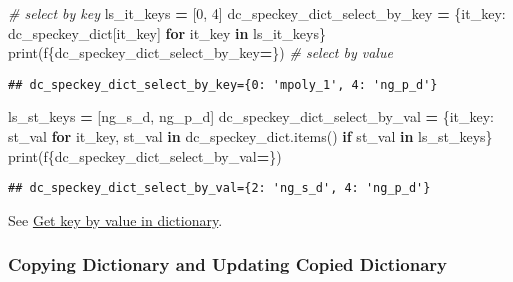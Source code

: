 \documentclass[
]{book}
\newenvironment{Shaded}{\begin{snugshade}}{\end{snugshade}}
\newcommand{\BuiltInTok}[1]{#1}
\newcommand{\CommentTok}[1]{\textcolor[rgb]{0.56,0.35,0.01}{\textit{#1}}}
\newcommand{\ControlFlowTok}[1]{\textcolor[rgb]{0.13,0.29,0.53}{\textbf{#1}}}
\newcommand{\DecValTok}[1]{\textcolor[rgb]{0.00,0.00,0.81}{#1}}
\newcommand{\KeywordTok}[1]{\textcolor[rgb]{0.13,0.29,0.53}{\textbf{#1}}}
\newcommand{\NormalTok}[1]{#1}
\newcommand{\OperatorTok}[1]{\textcolor[rgb]{0.81,0.36,0.00}{\textbf{#1}}}
\newcommand{\SpecialCharTok}[1]{\textcolor[rgb]{0.00,0.00,0.00}{#1}}
\newcommand{\SpecialStringTok}[1]{\textcolor[rgb]{0.31,0.60,0.02}{#1}}
\newcommand{\StringTok}[1]{\textcolor[rgb]{0.31,0.60,0.02}{#1}}
\begin{document}
\begin{Shaded}
\begin{Highlighting}[]
\CommentTok{\# select by key}
\NormalTok{ls\_it\_keys }\OperatorTok{=}\NormalTok{ [}\DecValTok{0}\NormalTok{, }\DecValTok{4}\NormalTok{]}
\NormalTok{dc\_speckey\_dict\_select\_by\_key }\OperatorTok{=}\NormalTok{ \{it\_key: dc\_speckey\_dict[it\_key] }\ControlFlowTok{for}\NormalTok{ it\_key }\KeywordTok{in}\NormalTok{ ls\_it\_keys\}}
\BuiltInTok{print}\NormalTok{(}\SpecialStringTok{f\textquotesingle{}}\SpecialCharTok{\{}\NormalTok{dc\_speckey\_dict\_select\_by\_key}\OperatorTok{=}\SpecialCharTok{\}}\SpecialStringTok{\textquotesingle{}}\NormalTok{)}
\CommentTok{\# select by value}
\end{Highlighting}
\end{Shaded}

\begin{verbatim}
## dc_speckey_dict_select_by_key={0: 'mpoly_1', 4: 'ng_p_d'}
\end{verbatim}

\begin{Shaded}
\begin{Highlighting}[]
\NormalTok{ls\_st\_keys }\OperatorTok{=}\NormalTok{ [}\StringTok{\textquotesingle{}ng\_s\_d\textquotesingle{}}\NormalTok{, }\StringTok{\textquotesingle{}ng\_p\_d\textquotesingle{}}\NormalTok{]}
\NormalTok{dc\_speckey\_dict\_select\_by\_val }\OperatorTok{=}\NormalTok{ \{it\_key: st\_val }\ControlFlowTok{for}\NormalTok{ it\_key, st\_val }\KeywordTok{in}\NormalTok{ dc\_speckey\_dict.items() }
                                 \ControlFlowTok{if}\NormalTok{ st\_val }\KeywordTok{in}\NormalTok{ ls\_st\_keys\}}
\BuiltInTok{print}\NormalTok{(}\SpecialStringTok{f\textquotesingle{}}\SpecialCharTok{\{}\NormalTok{dc\_speckey\_dict\_select\_by\_val}\OperatorTok{=}\SpecialCharTok{\}}\SpecialStringTok{\textquotesingle{}}\NormalTok{)}
\end{Highlighting}
\end{Shaded}

\begin{verbatim}
## dc_speckey_dict_select_by_val={2: 'ng_s_d', 4: 'ng_p_d'}
\end{verbatim}

See \href{https://stackoverflow.com/questions/8023306/get-key-by-value-in-dictionary}{Get key by value in dictionary}.

\hypertarget{copying-dictionary-and-updating-copied-dictionary}{%
\subsubsection{Copying Dictionary and Updating Copied Dictionary}\label{copying-dictionary-and-updating-copied-dictionary}}
\end{document}
